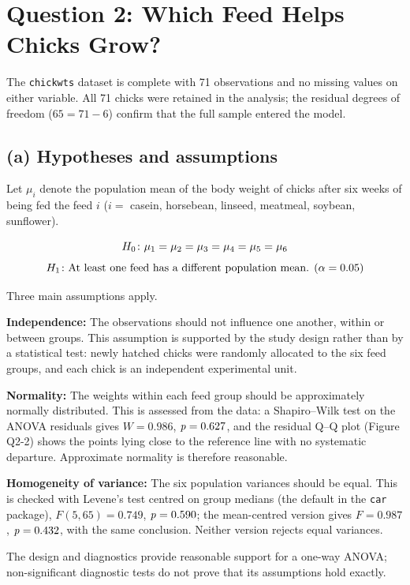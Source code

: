 \section{Question 2: Which Feed Helps Chicks Grow?}

The \texttt{chickwts} dataset is complete with 71 observations and no missing values on either variable. All 71 chicks were retained in the analysis; the residual degrees of freedom ($65 = 71 - 6$) confirm that the full sample entered the model.

\FloatBarrier
\subsection*{(a) Hypotheses and assumptions}

Let $\mu_i$ denote the population mean of the body weight of chicks after six weeks of being fed the feed $i$ ($i =$ casein, horsebean, linseed, meatmeal, soybean, sunflower).

\[
H_0\colon \mu_1 = \mu_2 = \mu_3 = \mu_4 = \mu_5 = \mu_6
\]
\[
H_1\colon \text{At least one feed has a different population mean. } (\alpha = 0.05)
\]

Three main assumptions apply.

\textbf{Independence:} The observations should not influence one another, within or between groups. This assumption is supported by the study design rather than by a statistical test: newly hatched chicks were randomly allocated to the six feed groups, and each chick is an independent experimental unit.

\textbf{Normality:} The weights within each feed group should be approximately normally distributed. This is assessed from the data: a Shapiro--Wilk test on the ANOVA residuals gives $W = 0.986$, $\mathit{p} = 0.627$, and the residual Q--Q plot (Figure Q2-2) shows the points lying close to the reference line with no systematic departure. Approximate normality is therefore reasonable.

\textbf{Homogeneity of variance:} The six population variances should be equal. This is checked with Levene's test centred on group medians (the default in the \texttt{car} package), $F(5, 65) = 0.749$, $\mathit{p} = 0.590$; the mean-centred version gives $F = 0.987$, $\mathit{p} = 0.432$, with the same conclusion. Neither version rejects equal variances.

The design and diagnostics provide reasonable support for a one-way ANOVA; non-significant diagnostic tests do not prove that its assumptions hold exactly.

